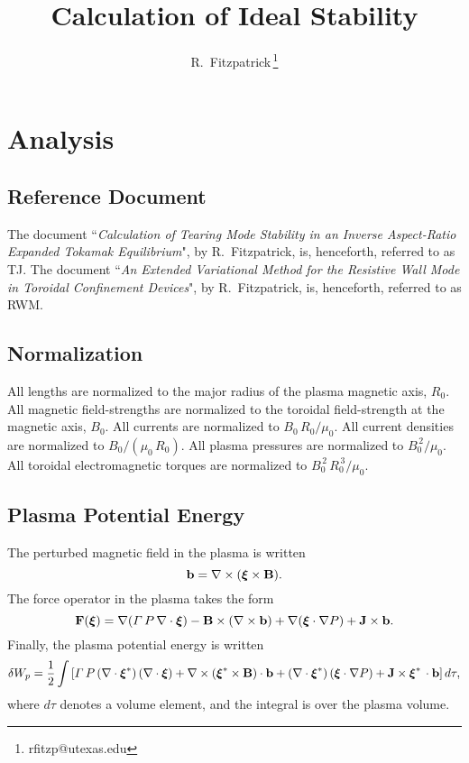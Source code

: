 \documentclass[12pt,prb,aps,notitlepage]{revtex4-1}
\newcommand{\bxi}{\mbox{\boldmath$\xi$}}
\begin{document}
\title{Calculation of Ideal Stability}
\author{R.~Fitzpatrick\,\footnote{rfitzp@utexas.edu}}
\begin{abstract}
\end{abstract}
\maketitle

\section{Analysis}
\subsection{Reference Document}
The document ``{\em Calculation of Tearing Mode Stability in an Inverse Aspect-Ratio Expanded Tokamak Equilibrium}", by R.~Fitzpatrick,  is, henceforth,
referred to as TJ. The document ``{\em An Extended Variational Method for the Resistive Wall Mode in Toroidal Confinement Devices}",
by R.~Fitzpatrick,  is, henceforth,
referred to as RWM. 

\subsection{Normalization}\label{coords}
All lengths are normalized to  the major radius of the plasma magnetic axis, $R_0$. All magnetic field-strengths
are normalized to the  toroidal field-strength at the magnetic axis, $B_0$. All currents are normalized to $B_0\,R_0/\mu_0$. All current densities are normalized to $B_0/(\mu_0\,R_0)$.  All plasma pressures are normalized to $B_0^{\,2}/\mu_0$.
All toroidal electromagnetic torques are normalized to $B_0^{\,2}\,R_0^{\,3}/\mu_0$. 

\subsection{Plasma Potential Energy}
The perturbed magnetic field in the plasma is written 
\begin{equation}
{\bf b} = \nabla\times (\bxi\times{\bf B}).
\end{equation}
The force operator in the plasma takes the form 
\begin{equation}
{\bf F}(\bxi)= \nabla({\mit\Gamma}\,P\,\nabla\cdot\bxi) - {\bf B}\times(\nabla\times {\bf b})+\nabla(\bxi\cdot\nabla P)+{\bf J}\times  {\bf b}.
\end{equation}
Finally, the plasma potential energy is written 
\begin{equation}
\delta W_p = \frac{1}{2}\int\left[{\mit\Gamma}\,P\,(\nabla\cdot\bxi^\ast)\,(\nabla\cdot\bxi)+ \nabla\times (\bxi^\ast\times {\bf B})\cdot {\bf b}
+(\nabla\cdot\bxi^\ast)\,(\bxi\cdot\nabla P)+
{\bf J}\times \bxi^\ast\,\cdot{\bf b}\right]d\tau,
\end{equation}
where $d\tau$ denotes a volume element, and the integral is over the plasma volume. 
\end{document}
